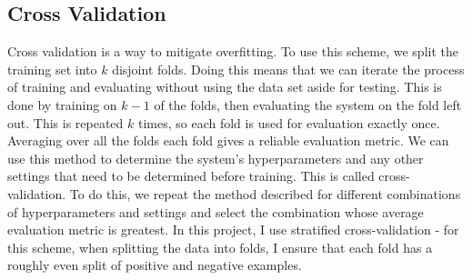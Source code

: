 \documentclass[12pt,a4paper,twoside,openright]{report}
\begin{document}
\subsection{Cross Validation} \label{cross-validation}
Cross validation is a way to mitigate overfitting. To use this scheme, we split the training set into $k$ disjoint folds. Doing this means that we can iterate the process of training and evaluating without using the data set aside for testing. This is done by training on $k-1$ of the folds, then evaluating the system on the fold left out. This is repeated $k$ times, so each fold is used for evaluation exactly once. Averaging over all the folds each fold gives a reliable evaluation metric. We can use this method to determine the system's hyperparameters and any other settings that need to be determined before training. This is called cross-validation. To do this, we repeat the method described for different combinations of hyperparameters and settings and select the combination whose average evaluation metric is greatest. In this project, I use stratified cross-validation - for this scheme, when splitting the data into folds, I ensure that each fold has a roughly even split of positive and negative examples.
\end{document}
